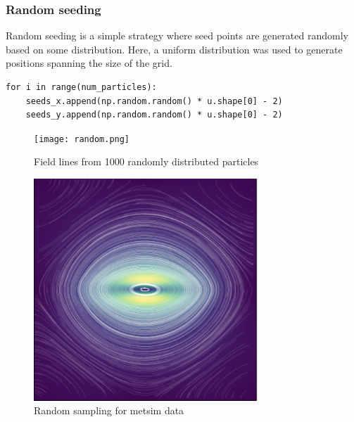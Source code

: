 \documentclass{article}
\begin{document}
\subsubsection{Random seeding}
Random seeding is a simple strategy where seed points are generated randomly based on some distribution.
Here, a uniform distribution was used to generate positions spanning the size of the grid.
\begin{verbatim}
for i in range(num_particles):
    seeds_x.append(np.random.random() * u.shape[0] - 2)
    seeds_y.append(np.random.random() * u.shape[0] - 2)
\end{verbatim}

\begin{figure}[h!]
    \centering
    \texttt{[image: random.png]}
    \caption{Field lines from 1000 randomly distributed particles}
\end{figure}
\newpage
\begin{figure}[h!]
    \centering
    \includegraphics[width=0.75\textwidth]{metsim_random_sampling.png}
    \caption{Random sampling for metsim data}
\end{figure}
\end{document}

